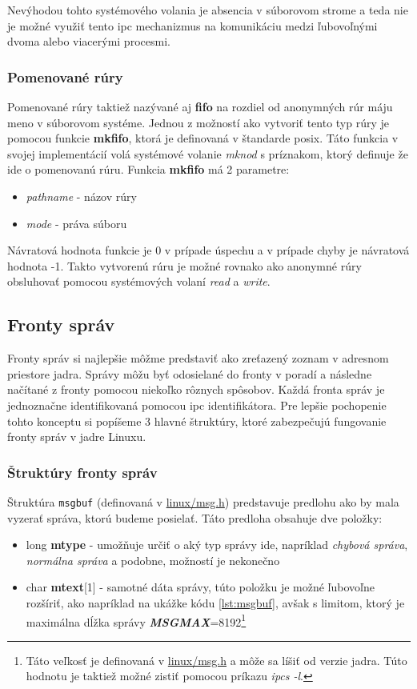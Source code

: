 Nevýhodou tohto systémového volania je absencia v súborovom strome a teda nie je možné využiť tento \acrshort{ipc} mechanizmus na komunikáciu medzi ľubovoľnými dvoma alebo viacerými procesmi.\cite{overview}
\subsubsection{Pomenované rúry}
Pomenované rúry taktiež nazývané aj \textbf{\acrshort{fifo}} na rozdiel od anonymných rúr máju meno v súborovom systéme. Jednou z možností ako vytvoriť tento typ rúry je pomocou funkcie \textbf{mkfifo}, ktorá je definovaná v štandarde \acrshort{posix}. Táto funkcia v svojej implementácií volá systémové volanie \textit{mknod} s príznakom, ktorý definuje že ide o pomenovanú rúru. Funkcia \textbf{mkfifo} má 2 parametre:
\begin{itemize}
\item \textit{pathname} - názov rúry
\item \textit{mode} - práva súboru 
\end{itemize}
Návratová hodnota funkcie je 0 v prípade úspechu a v prípade chyby je návratová hodnota -1. Takto vytvorenú rúru je možné rovnako ako anonymné rúry obsluhovať pomocou systémových volaní \textit{read} a \textit{write}.\cite{mkfifo}

\subsection{Fronty správ}
Fronty správ si najlepšie môžme predstaviť ako zreťazený zoznam v adresnom priestore jadra. Správy môžu byť odosielané do fronty v poradí a následne načítané z fronty pomocou niekoľko rôznych spôsobov. Každá fronta správ je jednoznačne identifikovaná pomocou \acrshort{ipc} identifikátora. Pre lepšie pochopenie tohto konceptu si popíšeme 3 hlavné štruktúry, ktoré zabezpečujú fungovanie fronty správ v jadre Linuxu.\cite{guide}
\subsubsection{Štruktúry fronty správ} \label{msgstruct}
Štruktúra \texttt{msgbuf} (definovaná v \url{linux/msg.h}) predstavuje predlohu ako by mala vyzerať správa, ktorú budeme posielať. Táto predloha obsahuje dve položky: 
\begin{itemize}
\item long \textbf{mtype} - umožňuje určiť o aký typ správy ide, napríklad \textit{chybová správa}, \textit{normálna správa} a podobne, možností je nekonečno
\item char \textbf{mtext}[1] - samotné dáta správy, túto položku je možné ľubovoľne rozšíriť, ako napríklad na ukážke kódu \ref{lst:msgbuf}, avšak s limitom, ktorý je maximálna dĺžka správy \textit{\textbf{MSGMAX}}=8192\footnote{Táto veľkosť je definovaná v \url{linux/msg.h} a môže sa líšiť od verzie jadra. Túto hodnotu je taktiež možné zistiť pomocou príkazu \textit{ipcs -l}.}
\end{itemize}

